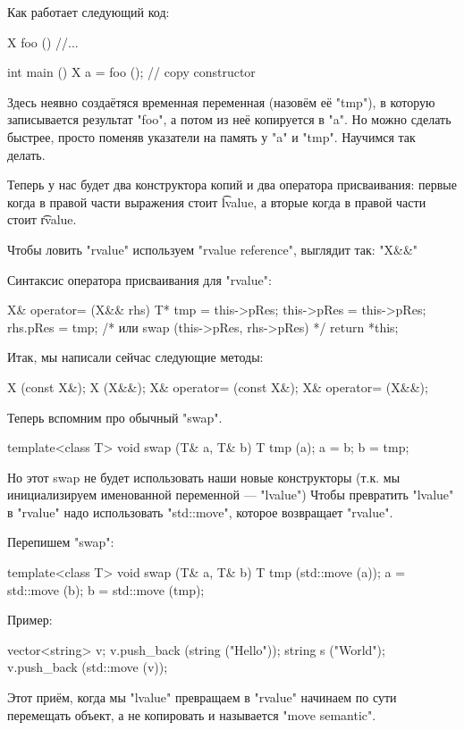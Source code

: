 Как работает следующий код:
\begin{cppcode}
X foo () {
	//...
}

int main () {
	X a = foo (); // copy constructor
}
\end{cppcode}
Здесь неявно создаётяся временная переменная (назовём её \cpp"tmp"), в которую записывается 
результат \cpp"foo", а потом из неё копируется в \cpp"a". Но можно сделать быстрее, просто поменяв 
указатели на память у \cpp"a" и \cpp"tmp". Научимся так делать. 

Теперь у нас будет два конструктора копий и два оператора присваивания: первые когда в правой части выражения стоит \t{lvalue}, 
а вторые когда в правой части стоит \t{rvalue}. 

Чтобы ловить \cpp"rvalue" используем \cpp"rvalue reference", выглядит так: \cpp"X&&"

Синтаксис оператора присваивания для \cpp"rvalue":
\begin{cppcode}
X& operator= (X&& rhs) {
  T* tmp = this->pRes; 
  this->pRes = this->pRes; 
  rhs.pRes = tmp;
  /* или swap (this->pRes, rhs->pRes) */
  return *this; 
}
\end{cppcode}

Итак, мы написали сейчас следующие методы:
\begin{cppcode}
  X (const X&); 
  X (X&&);
  X& operator= (const X&);
  X& operator= (X&&);
\end{cppcode}

Теперь вспомним про обычный \cpp"swap". 
\begin{cppcode}
template<class T>
void swap (T& a, T& b) {
  T tmp (a);
  a = b;
  b = tmp;
}
\end{cppcode}

Но этот swap не будет использовать наши новые конструкторы (т.к. мы инициализируем именованной переменной --- \cpp"lvalue")
Чтобы превратить \cpp"lvalue" в \cpp"rvalue"  надо использовать \cpp"std::move", которое возвращает \cpp"rvalue". 

Перепишем \cpp"swap":
\begin{cppcode}
template<class T>
void swap (T& a, T& b) {
  T tmp (std::move (a));
  a = std::move (b);
  b = std::move (tmp);
}
\end{cppcode}

Пример:
\begin{cppcode}
	vector<string> v;
	v.push_back (string ("Hello"));
	string s ("World");
	v.push_back (std::move (v));
\end{cppcode}

Этот приём, когда мы \cpp"lvalue" превращаем в \cpp"rvalue" начинаем по сути перемещать объект, а не копировать и называется
\cpp"move semantic".